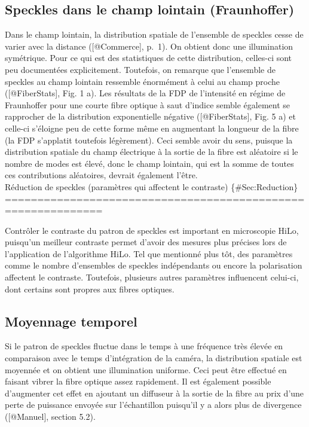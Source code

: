 \documentclass[]{article}
\begin{document}
\subsection{Speckles dans le champ lointain
(Fraunhoffer)}\label{speckles-dans-le-champ-lointain-fraunhoffer}

Dans le champ lointain, la distribution spatiale de l'ensemble de
speckles cesse de varier avec la distance ({[}@Commerce{]}, p.~1). On
obtient donc une illumination symétrique. Pour ce qui est des
statistiques de cette distribution, celles-ci sont peu documentées
explicitement. Toutefois, on remarque que l'ensemble de speckles au
champ lointain ressemble énormément à celui au champ proche
({[}@FiberStats{]}, Fig. 1 a). Les résultats de la FDP de l'intensité en
régime de Fraunhoffer pour une courte fibre optique à saut d'indice
semble également se rapprocher de la distribution exponentielle négative
({[}@FiberStats{]}, Fig. 5 a) et celle-ci s'éloigne peu de cette forme
même en augmentant la longueur de la fibre (la FDP s'applatit toutefois
légèrement). Ceci semble avoir du sens, puisque la distribution spatiale
du champ électrique à la sortie de la fibre est aléatoire si le nombre
de modes est élevé, donc le champ lointain, qui est la somme de toutes
ces contributions aléatoires, devrait également l'être.\\
Réduction de speckles (paramètres qui affectent le contraste)
\{\#Sec:Reduction\}
=============================================================

Contrôler le contraste du patron de speckles est important en
microscopie HiLo, puisqu'un meilleur contraste permet d'avoir des
mesures plus précises lors de l'application de l'algorithme HiLo. Tel
que mentionné plus tôt, des paramètres comme le nombre d'ensembles de
speckles indépendants ou encore la polarisation affectent le contraste.
Toutefois, plusieurs autres paramètres influencent celui-ci, dont
certains sont propres aux fibres optiques.

\subsection{Moyennage temporel}\label{moyennage-temporel}

Si le patron de speckles fluctue dans le temps à une fréquence très
élevée en comparaison avec le temps d'intégration de la caméra, la
distribution spatiale est moyennée et on obtient une illumination
uniforme. Ceci peut être effectué en faisant vibrer la fibre optique
assez rapidement. Il est également possible d'augmenter cet effet en
ajoutant un diffuseur à la sortie de la fibre au prix d'une perte de
puissance envoyée sur l'échantillon puisqu'il y a alors plus de
divergence ({[}@Manuel{]}, section 5.2).
\end{document}
